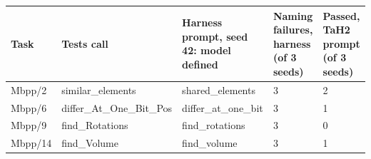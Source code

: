 \begin{tabular}{lllll}
\toprule
Task & Tests call & Harness prompt, seed 42: model defined & Naming failures, harness (of 3 seeds) & Passed, TaH2 prompt (of 3 seeds) \\
\midrule
Mbpp/2 & similar\_elements & shared\_elements & 3 & 2 \\
Mbpp/6 & differ\_At\_One\_Bit\_Pos & differ\_at\_one\_bit & 3 & 1 \\
Mbpp/9 & find\_Rotations & find\_rotations & 3 & 0 \\
Mbpp/14 & find\_Volume & find\_volume & 3 & 1 \\
\bottomrule
\end{tabular}
